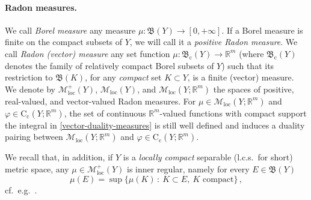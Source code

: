 \documentclass[11pt,reqno]{amsart}
\numberwithin{equation}{section}
\newcommand{\R}{\mathbb{R}}
\theoremstyle{definition}
\newcommand{\Cc}{\mathrm{C}_{\mathrm{c}}}
\newcommand{\frB}{\mathfrak B}
\newcommand{\Mloc}{\mathcal{M}_{\mathrm{loc}}}
\newcommand{\RCR}{\color{magenta}}
\newcommand{\RNEW}{\color{black}} %
\newcommand{\TODO}[1]{\todo[inline, color=cyan!20]{#1}}
\newcommand{\EEE}{\color{black}}
\numberwithin{equation}{section}
\begin{document}
\paragraph{\bf Radon measures.}
We call \emph{Borel measure} any measure $\mu: \mathfrak{B}(Y) \to [0,+\infty]$. If a Borel measure is finite on the compact subsets of $Y$, we will call it a \emph{positive Radon measure}.
We  call \emph{Radon (vector) measure} any  set function $\mu : \mathfrak{B}_{\mathrm{c}}(Y) \to \R^m$ (where $\mathfrak{B}_{\mathrm{c}}(Y) $ denotes the family of relatively compact Borel subsets of $Y$)  \RNEW such that its restriction to $\frB(K) $,
for any \emph{compact} set $K\subset Y$, \EEE  is a finite (vector) measure. We denote by $\Mloc^+(Y)$, $\Mloc(Y)$, and $\Mloc(Y;\R^m) $  the spaces of positive, real-valued, and vector-valued Radon measures. 
For $\mu \in  \Mloc(Y;\R^m) $  and $\varphi \in \Cc(Y;\R^m)$, the set of continuous $\R^m$-valued functions with compact support the integral in \eqref{vector-duality-measures}
is still well defined and induces a duality pairing between $ \Mloc(Y;\R^m) $  and $\varphi \in \Cc(Y;\R^m)$. 
 \par
We recall that, in addition, if $Y$ is a \emph{locally compact} separable (l.c.s.\ for short) metric space, any $\mu \in \Mloc^+(Y)$  is inner regular, 
namely \RCR for every $E \in \mathfrak{B}(Y)$
\begin{equation}
\label{inner-regularity}
\mu(E) = \sup\{ \mu(K) \, : \ K \subset E, \ K \text{ compact}\}\,,
\end{equation} \EEE
cf.\ e.g.\ \cite[Prop.\ 1.43]{AmFuPa05FBVF}. 
\end{document}
